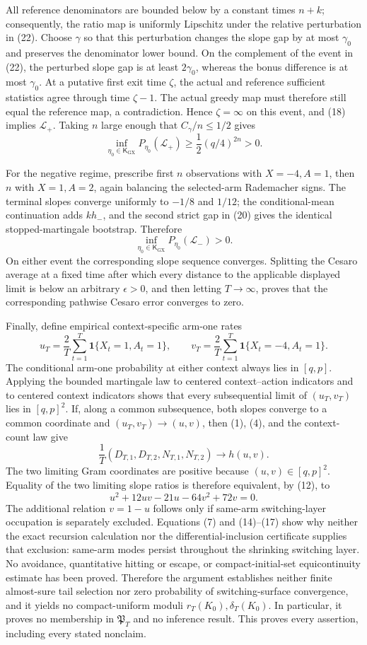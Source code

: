 All reference denominators are bounded below by a constant times \(n+k\); consequently, the ratio map is uniformly Lipschitz under the relative perturbation in (22). Choose \(\gamma\) so that this perturbation changes the slope gap by at most \(\gamma_0\) and preserves the denominator lower bound. On the complement of the event in (22), the perturbed slope gap is at least \(2\gamma_0\), whereas the bonus difference is at most \(\gamma_0\). At a putative first exit time \(\zeta\), the actual and reference sufficient statistics agree through time \(\zeta-1\). The actual greedy map must therefore still equal the reference map, a contradiction. Hence \(\zeta=\infty\) on this event, and (18) implies \(\mathcal L_+\). Taking \(n\) large enough that \(C_\gamma/n\le1/2\) gives
\[
 \inf_{\eta_0\in\mathsf K_{\mathrm{GX}}}P_{\eta_0}(\mathcal L_+)
 \ge\frac12(q/4)^{2n}>0. \tag{23}
\]

For the negative regime, prescribe first \(n\) observations with \(X=-4,A=1\), then \(n\) with \(X=1,A=2\), again balancing the selected-arm Rademacher signs. The terminal slopes converge uniformly to \(-1/8\) and \(1/12\); the conditional-mean continuation adds \(kh_-\), and the second strict gap in (20) gives the identical stopped-martingale bootstrap. Therefore
\[
 \inf_{\eta_0\in\mathsf K_{\mathrm{GX}}}P_{\eta_0}(\mathcal L_-)>0. \tag{24}
\]
On either event the corresponding slope sequence converges. Splitting the Cesaro average at a fixed time after which every distance to the applicable displayed limit is below an arbitrary \(\epsilon>0\), and then letting \(T\to\infty\), proves that the corresponding pathwise Cesaro error converges to zero.

Finally, define empirical context-specific arm-one rates
\[
 u_T=\frac2T\sum_{t=1}^T\mathbf1\{X_t=1,A_t=1\},
 \qquad
 v_T=\frac2T\sum_{t=1}^T\mathbf1\{X_t=-4,A_t=1\}.
\]
The conditional arm-one probability at either context always lies in \([q,p]\). Applying the bounded martingale law to centered context--action indicators and to centered context indicators shows that every subsequential limit of \((u_T,v_T)\) lies in \([q,p]^2\). If, along a common subsequence, both slopes converge to a common coordinate and \((u_T,v_T)\to(u,v)\), then (1), (4), and the context-count law give
\[
 \frac1T(D_{T,1},D_{T,2},N_{T,1},N_{T,2})\longrightarrow h(u,v).
\]
The two limiting Gram coordinates are positive because \((u,v)\in[q,p]^2\). Equality of the two limiting slope ratios is therefore equivalent, by (12), to
\[
 u^2+12uv-21u-64v^2+72v=0.
\]
The additional relation \(v=1-u\) follows only if same-arm switching-layer occupation is separately excluded. Equations (7) and (14)--(17) show why neither the exact recursion calculation nor the differential-inclusion certificate supplies that exclusion: same-arm modes persist throughout the shrinking switching layer. No avoidance, quantitative hitting or escape, or compact-initial-set equicontinuity estimate has been proved. Therefore the argument establishes neither finite almost-sure tail selection nor zero probability of switching-surface convergence, and it yields no compact-uniform moduli \(r_T(K_0),\delta_T(K_0)\). In particular, it proves no membership in \(\mathfrak P_T\) and no inference result. This proves every assertion, including every stated nonclaim.